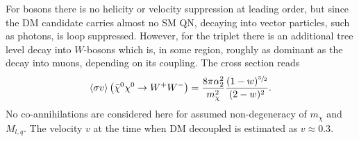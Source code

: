 For bosons there is no helicity or velocity suppression at leading order, but since the DM candidate carries almost no SM QN, decaying into vector
particles, such as photons, is loop suppressed. However, for the triplet there is an additional tree level decay into $W$-bosons which is, in some 
region, roughly as dominant as the decay into muons, depending on its coupling. The cross section reads\cite{1401.6212}
\begin{align}
 \langle \sigma v \rangle \left(\bar \chi^0 \chi^0 \rightarrow W^+W^-\right) = \frac{8\pi \alpha_2^2}{m_\chi^2} \frac{(1-w)^{\sfrac32}}{(2-w)^2}.
\end{align}
No co-annihilations are considered here for assumed non-degeneracy of $m_\chi$ and $M_{l,q}$. The velocity $v$ at the time when DM decoupled is
estimated as $v\approx 0.3$. 
